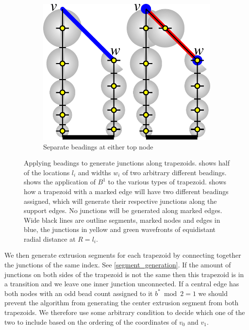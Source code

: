 \begin{figure}
\begin{subfigure}{0.5\columnwidth}
\end{subfigure}
\begin{subfigure}{0.34\columnwidth}\centering
\includegraphics[height=\figheight]{sources/method/trapezoid_beading_separate.pdf}
\caption{Separate beadings at either top node}\label{trapezoid_beading_separate}
\end{subfigure}
\caption{
Applying beadings to generate junctions along trapezoids.
 shows half of the locations $l_i$ and widths $w_i$ of two arbitrary different beadings.
 shows the application of $B^1$ to the various types of trapezoid.
 shows how a trapezoid with a marked edge will have two different beadings assigned, which will generate their respective junctions along the support edges.
No junctions will be generated along marked edges.
Wide black lines are outline segments, marked nodes and edges in blue, the junctions in yellow and green wavefronts of equidistant radial distance at $R = l_i$.
}
\label{junction_placement}
\end{figure}


We then generate extrusion segments for each trapezoid by connecting together the junctions of the same index.
See \cref{segment_generation}.
If the amount of junctions on both sides of the trapezoid is not the same then this trapezoid is in a transition and we leave one inner junction unconnected.
If a central edge has both nodes with an odd bead count assigned to it $b^* \bmod 2 = 1 $ we should prevent the algorithm from generating the center extrusion segment from both trapezoids.
We therefore use some arbitrary condition to decide which one of the two to include based on the ordering of the coordinates of $v_0$ and $v_1$.

